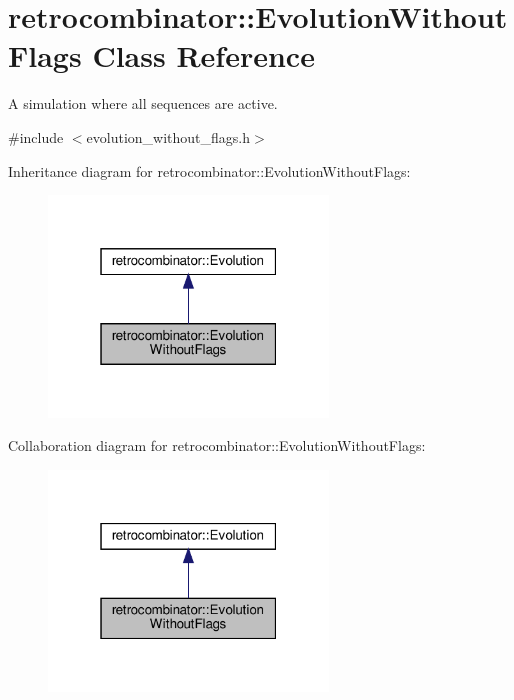 \hypertarget{classretrocombinator_1_1EvolutionWithoutFlags}{}\section{retrocombinator\+:\+:Evolution\+Without\+Flags Class Reference}
\label{classretrocombinator_1_1EvolutionWithoutFlags}


A simulation where all sequences are active.  




{\ttfamily \#include $<$evolution\+\_\+without\+\_\+flags.\+h$>$}



Inheritance diagram for retrocombinator\+:\+:Evolution\+Without\+Flags\+:\nopagebreak
\begin{figure}[H]
\begin{center}
\leavevmode
\includegraphics[width=211pt]{classretrocombinator_1_1EvolutionWithoutFlags__inherit__graph}
\end{center}
\end{figure}


Collaboration diagram for retrocombinator\+:\+:Evolution\+Without\+Flags\+:\nopagebreak
\begin{figure}[H]
\begin{center}
\leavevmode
\includegraphics[width=211pt]{classretrocombinator_1_1EvolutionWithoutFlags__coll__graph}
\end{center}
\end{figure}
